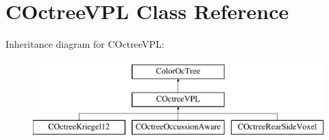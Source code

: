 \hypertarget{classCOctreeVPL}{}\section{C\+Octree\+V\+PL Class Reference}
\label{classCOctreeVPL}
Inheritance diagram for C\+Octree\+V\+PL\+:\begin{figure}[H]
\begin{center}
\leavevmode
\includegraphics[height=3.000000cm]{classCOctreeVPL}
\end{center}
\end{figure}
